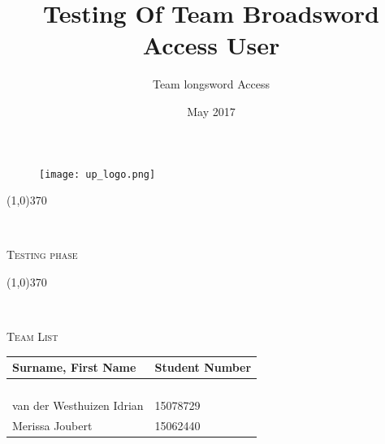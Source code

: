 \documentclass[english]{article}
\begin{document}
\title{Testing Of Team Broadsword Access User }

\author{Team longsword Access }

\date{May 2017}

\maketitle



	\begin{figure}

		\texttt{[image: up\_logo.png]}

	\end{figure}

	

	\begin{center}

	 \line(1,0){370}

	\\[0.2cm]

    	{\scshape\Large Testing phase  \par}

	\vspace{0.1cm}

	\line(1,0){370}

	\\[0.8cm]

	

	 {\scshape\Large Team List \par}

	\vspace{0.9cm}

	

	\begin{tabu} to \textwidth { X[l] X[l]}

		\hline

		\textbf{Surname, First Name  }	& \textbf{Student Number}	\\ \hline \hline

		   &	\\ \hline

		  &	\\ \hline

		  &	\\ \hline

	    	 &	\\ \hline

		van der Westhuizen Idrian&15078729\\ \hline Merissa Joubert &15062440	\\ \hline

		\hline

	\end{tabu}

	

	\end{center}
\end{document}
